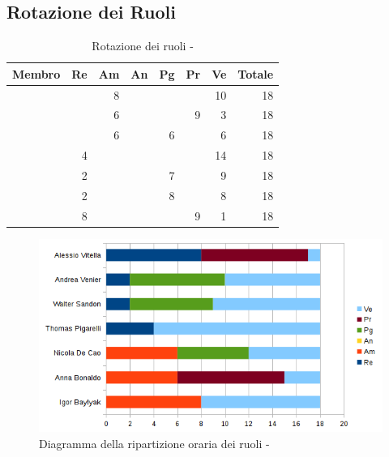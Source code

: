 \documentclass[12pt,a4paper]{article}
\begin{document}
\newpage

\subsection{Rotazione dei Ruoli}

\begin{table}[H]
	\begin{center}
		\begin{tabular}{l r r r r r r r}
			\toprule
			\textbf{Membro}	&	\textbf{Re}	&	\textbf{Am}	& \textbf{An} & \textbf{Pg} & \textbf{Pr} & \textbf{Ve} & \textbf{Totale}\\
			\midrule
			\midrule
			\IB &  & 8 &  &  &  & 10 & 18 \\
			\midrule
			\AB &  & 6 &  &  & 9 & 3 & 18 \\
			\midrule
			\NDC &  & 6 &  & 6 &  & 6 & 18 \\
			\midrule
			\TP & 4 & & & & &14 & 18 \\
			\midrule
			\WS & 2 &  &  & 7 &  & 9 & 18 \\
			\midrule
			\AVE & 2 &  &  & 8 &  & 8 & 18 \\
			\midrule
			\AVI & 8 &  &  &  & 9 & 1 & 18 \\
			\bottomrule
		\end{tabular}
		\caption{Rotazione dei ruoli - \FVV}
	\end{center}
\end{table}

\begin{center}
	\begin{figure}[H]
		\centering
		\includegraphics[width=\textwidth]{diagrammaBarreVerificaValidazioneRotazioneRuoli.png}
		\caption{Diagramma della ripartizione oraria dei ruoli - \FVV}
	\end{figure}
\end{center}
\end{document}
